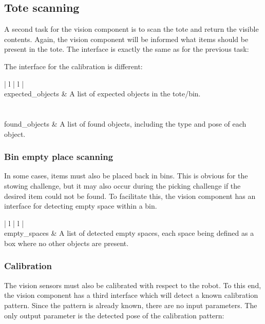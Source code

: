 \documentclass[a4paper]{article}
\begin{document}
\subsection*{Tote scanning}
A second task for the vision component is to scan the tote and return the visible contents.
Again, the vision component will be informed what items should be present in the tote.
The interface is exactly the same as for the previous task:

The interface for the calibration is different:

\begin{tabular}{| l | l |}
\hline
{} \\
\hline
expected\_objects & A list of expected objects in the tote/bin. \\
\hline
{} \\
\hline
{} \\
\hline
found\_objects  & A list of found objects, including the type and pose of each object. \\
\hline
\end{tabular}

\subsubsection*{Bin empty place scanning}
In some cases, items must also be placed back in bins.
This is obvious for the stowing challenge,
but it may also occur during the picking challenge if the desired item could not be found.
To facilitate this, the vision component has an interface for detecting empty space within a bin.

\begin{tabular}{| l | l |}
\hline
{} \\
\hline
empty\_spaces  & A list of detected empty spaces,
each space being defined as a box where no other objects are present. \\
\hline
\end{tabular}

\subsubsection*{Calibration}
The vision sensors must also be calibrated with respect to the robot.
To this end, the vision component has a third interface which will detect a known calibration pattern.
Since the pattern is already known, there are no input parameters.
The only output parameter is the detected pose of the calibration pattern:
\end{document}
